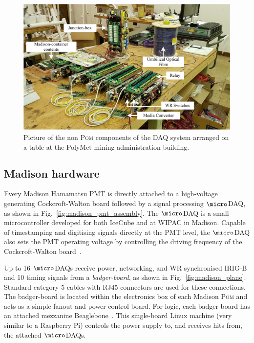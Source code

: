 \begin{figure} %
    \includegraphics[width=\textwidth]{diagrams/5-daq/full_setup.pdf}
    \caption[Picture of the non \textsc{Pom} components of the \chipsfive DAQ system]
    {Picture of the non \textsc{Pom} components of the \chipsfive DAQ system arranged on a table
        at the PolyMet mining administration building.}
    \label{fig:full_setup}
\end{figure}

\subsection{Madison hardware} %
\label{sec:daq_hard_madison} %

Every Madison Hamamatsu PMT is directly attached to a high-voltage generating Cockcroft-Walton
board followed by a signal processing $\micro$DAQ, as shown in
Fig.~\ref{fig:madison_pmt_assembly}. The $\micro$DAQ is a small microcontroller developed for both
IceCube and \chips at WIPAC in Madison. Capable of timestamping and digitising signals directly at
the PMT level, the $\micro$DAQ also sets the PMT operating voltage by controlling the driving
frequency of the Cockcroft-Walton board~\cite{eijk2018}.

Up to 16 $\micro$DAQs receive power, networking, and WR synchronised IRIG-B and
\unit{10}{} timing signals from a \emph{badger-board}, as shown in
Fig.~\ref{fig:madison_plane}. Standard category 5 cables with RJ45 connectors are used for these
connections. The badger-board is located within the electronics box of each Madison \textsc{Pom}
and acts as a simple fanout and power control board. For logic, each badger-board has an attached
mezzanine Beaglebone~\cite{beagle2020}. This single-board Linux machine (very similar to a
Raspberry Pi) controls the power supply to, and receives hits from, the attached $\micro$DAQs.

